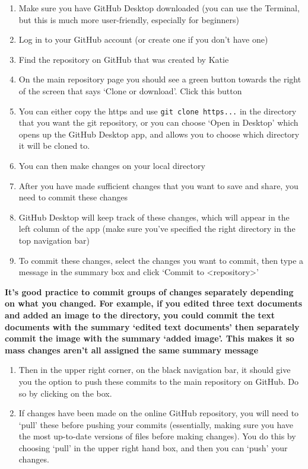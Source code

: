 \documentclass[
  letterpaper,
  DIV=11,
  numbers=noendperiod]{scrreprt}
\begin{document}
\begin{enumerate}
\def\labelenumi{\arabic{enumi}.}
\item
  Make sure you have GitHub Desktop downloaded (you can use the
  Terminal, but this is much more user-friendly, especially for
  beginners)
\item
  Log in to your GitHub account (or create one if you don't have one)
\item
  Find the repository on GitHub that was created by Katie
\item
  On the main repository page you should see a green button towards the
  right of the screen that says `Clone or download'. Click this button
\item
  You can either copy the https and use \texttt{git\ clone\ https...} in
  the directory that you want the git repository, or you can choose
  `Open in Desktop' which opens up the GitHub Desktop app, and allows
  you to choose which directory it will be cloned to.
\item
  You can then make changes on your local directory
\item
  After you have made sufficient changes that you want to save and
  share, you need to commit these changes
\item
  GitHub Desktop will keep track of these changes, which will appear in
  the left column of the app (make sure you've specified the right
  directory in the top navigation bar)
\item
  To commit these changes, select the changes you want to commit, then
  type a message in the summary box and click `Commit to
  \textless repository\textgreater{}'
\end{enumerate}

\textbf{It's good practice to commit groups of changes separately
depending on what you changed. For example, if you edited three text
documents and added an image to the directory, you could commit the text
documents with the summary `edited text documents' then separately
commit the image with the summary `added image'. This makes it so mass
changes aren't all assigned the same summary message}

\begin{enumerate}
\def\labelenumi{\arabic{enumi}.}
\item
  Then in the upper right corner, on the black navigation bar, it should
  give you the option to push these commits to the main repository on
  GitHub. Do so by clicking on the box.
\item
  If changes have been made on the online GitHub repository, you will
  need to `pull' these before pushing your commits (essentially, making
  sure you have the most up-to-date versions of files before making
  changes). You do this by choosing `pull' in the upper right hand box,
  and then you can `push' your changes.
\end{enumerate}
\end{document}
